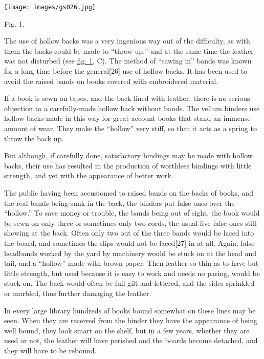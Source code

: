 \documentclass[
]{article}
\begin{document}
\protect\hypertarget{Fig_1}{}{}
\texttt{[image: images/gs026.jpg]}

Fig. 1.

The use of hollow backs was a very ingenious way out of the difficulty,
as with them the backs could be made to ``throw up,'' and at the same
time the leather was not disturbed (see \protect\hyperlink{Fig_1}{fig.
1}, C). The method of ``sawing in'' bands was known for a long time
before the general{\protect\hypertarget{Page_26}{}{{[}26{]}}} use of
hollow backs. It has been used to avoid the raised bands on books
covered with embroidered material.

If a book is sewn on tapes, and the back lined with leather, there is no
serious objection to a carefully-made hollow back without bands. The
vellum binders use hollow backs made in this way for great account books
that stand an immense amount of wear. They make the ``hollow'' very
stiff, so that it acts as a spring to throw the back up.

But although, if carefully done, satisfactory bindings may be made with
hollow backs, their use has resulted in the production of worthless
bindings with little strength, and yet with the appearance of better
work.

The public having been accustomed to raised bands on the backs of books,
and the real bands being sunk in the back, the binders put false ones
over the ``hollow.'' To save money or trouble, the bands being out of
sight, the book would be sewn on only three or sometimes only two cords,
the usual five false ones still showing at the back. Often only two out
of the three bands would be laced into the board, and sometimes the
slips would not be laced{\protect\hypertarget{Page_27}{}{{[}27{]}}} in
at all. Again, false headbands worked by the yard by machinery would be
stuck on at the head and tail, and a ``hollow'' made with brown paper.
Then leather so thin as to have but little strength, but used because it
is easy to work and needs no paring, would be stuck on. The back would
often be full gilt and lettered, and the sides sprinkled or marbled,
thus further damaging the leather.

In every large library hundreds of books bound somewhat on these lines
may be seen. When they are received from the binder they have the
appearance of being well bound, they look smart on the shelf, but in a
few years, whether they are used or not, the leather will have perished
and the boards become detached, and they will have to be rebound.
\end{document}
